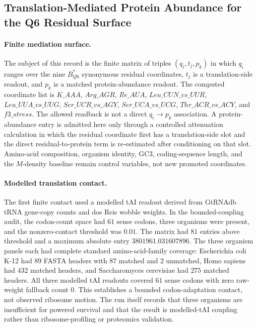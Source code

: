 \subsection{Translation-Mediated Protein Abundance for the Q6 Residual Surface}\label{sec:q6-translation-mediated-protein-abundance-cross-layer}

\paragraph{Finite mediation surface.}
The subject of this record is the finite matrix of triples $(q_i,t_j,p_k)$ in which $q_i$ ranges over the nine $B^*_{Q6}$ synonymous residual coordinates, $t_j$ is a translation-side readout, and $p_k$ is a matched protein-abundance readout.  The computed coordinate list is $K\_AAA$, $Arg\_AGR$, $Ile\_AUA$, $Leu\_CUN\_vs\_UUR$, $Leu\_UUA\_vs\_UUG$, $Ser\_UCR\_vs\_AGY$, $Ser\_UCA\_vs\_UCG$, $Thr\_ACR\_vs\_ACY$, and $f3\_stress$.  The allowed readback is not a direct $q_i\to p_k$ association.  A protein-abundance entry is admitted here only through a controlled attenuation calculation in which the residual coordinate first has a translation-side slot and the direct residual-to-protein term is re-estimated after conditioning on that slot.  Amino-acid composition, organism identity, GC3, coding-sequence length, and the $M$-density baseline remain control variables, not new promoted coordinates.

\paragraph{Modelled translation contact.}
The first finite contact used a modelled tAI readout derived from GtRNAdb tRNA gene-copy counts and dos Reis wobble weights.  In the bounded-coupling audit, the codon-count space had $61$ sense codons, three organisms were present, and the nonzero-contact threshold was $0.01$.  The matrix had $81$ entries above threshold and a maximum absolute entry $3801961.031607896$.  The three organism panels each had complete standard amino-acid-family coverage: Escherichia coli K-12 had $89$ FASTA headers with $87$ matched and $2$ unmatched, Homo sapiens had $432$ matched headers, and Saccharomyces cerevisiae had $275$ matched headers.  All three modelled tAI readouts covered $61$ sense codons with zero raw-weight fallback count $0$.  This establishes a bounded codon-adaptation contact, not observed ribosome motion.  The run itself records that three organisms are insufficient for powered survival and that the result is modelled-tAI coupling rather than ribosome-profiling or proteomics validation.

